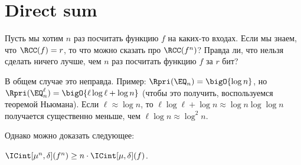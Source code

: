 \section{Direct sum}

Пусть мы хотим $n$ раз посчитать функцию $f$ на каких-то входах. Если мы знаем, что $\RCC(f) = r$, то что
можно сказать про $\RCC(f^n)$? Правда ли, что нельзя сделать ничего лучше, чем $n$ раз посчитать функцию
$f$ за $r$ бит?

В общем случае это неправда. Пример: $\Rpri(\EQ_n) = \bigO{\log{n}}$, но $\Rpri(\EQ^{\ell}_n) =
\bigO{\ell \log{\ell} + \log{n}}$ (чтобы это получить, воспользуемся теоремой Ньюмана). Если $\ell
\approx \log{n}$, то $\ell \log{\ell} + \log{n} \approx \log{n} \log{\log{n}}$ получается существенно
меньше, чем $\ell \log{n} \approx \log^2{n}$. 

Однако можно доказать следующее:

\begin{theorem}
    $\ICint[\mu^n, \delta](f^n) \geq n \cdot \ICint[\mu, \delta](f)$.
\end{theorem}

